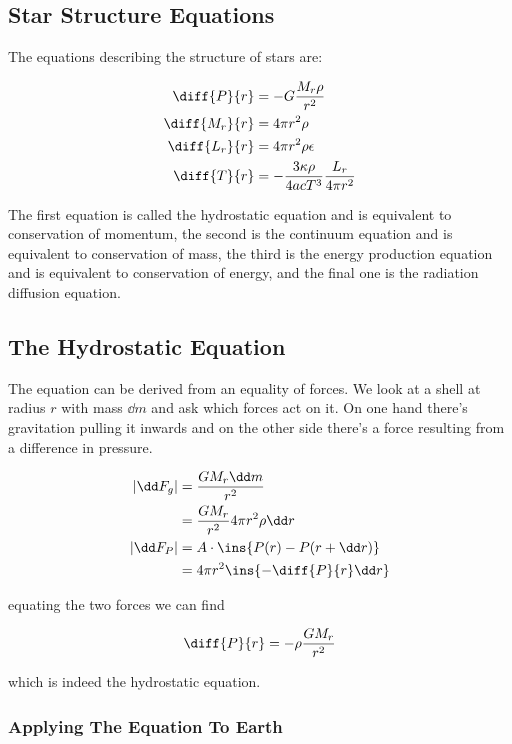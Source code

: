 \subsection{Star Structure Equations}

The equations describing the structure of stars are:

\begin{align}
	\diff{P}{r} &= -G\frac{M_r\rho}{r^2}\\
	\diff{M_r}{r} &= 4\pi r^2 \rho \\
	\diff{L_r}{r} &= 4\pi r^2\rho\epsilon \\
	\diff{T}{r} &= -\frac{3\kappa\rho}{4acT^3}\frac{L_r}{4\pi r^2}
\end{align}

The first equation is called the hydrostatic equation and is equivalent to conservation of momentum, the second is the continuum equation and is equivalent to conservation of mass, the third is the energy production equation and is equivalent to conservation of energy, and the final one is the radiation diffusion equation.

\subsection{The Hydrostatic Equation}

The equation can be derived from an equality of forces. We look at a shell at radius \(r\) with mass \(\dd m\) and ask which forces act on it. On one hand there's gravitation pulling it inwards and on the other side there's a force resulting from a difference in pressure.

\begin{align}
	\lvert \dd F_g \rvert &= \frac{GM_r\dd m}{r^2}\\
	&= \frac{GM_r}{r^2}4\pi r^2\rho \dd r\\
	\lvert\dd F_P\rvert &= A\cdot\ins{P(r)-P(r+\dd r)}\\
	&= 4\pi r^2\ins{-\diff{P}{r}\dd r}
\end{align}

equating the two forces we can find

\begin{align}
	\diff{P}{r} = -\rho\frac{GM_r}{r^2}
\end{align}

which is indeed the hydrostatic equation.

\subsubsection{Applying The Equation To Earth}

